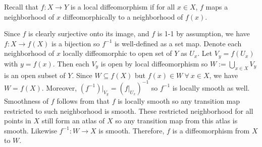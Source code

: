 \documentclass[12pt]{article}
\begin{document}
\begin{problem}[1.3.5]
Recall that $ f:X \to Y$ is a local diffeomorphism if for all $ x \in X$, $ f$  maps a neighborhood of $ x$ diffeomorphically to a neighborhood of  $ f(x)$. 

Since $ f$ is clearly surjective onto its image, and $ f$ is 1-1 by assumption, we have  $ f:X \to f(X)$ is a bijection so $ f^{-1}$ is well-defined as a set map. Denote each neighborhood of $ x$ locally diffeomorphic to open set of $ Y$ as  $ U_x$. Let $ V_y = f(U_x)$ with  $ y = f(x)$. Then each $ V_y$ is open by local diffeomorphism so $ W:=\bigcup_{ x \in X} V_y $ is an open subset of $ Y$. Since $ W \subseteq f(X)$ but $ f(x) \in W \ \forall \ x \in X$, we have $ W = f(X)$. Moreover, $ (f^{-1})|_{V_y} = (f|_{U_x})^{-1}$ so $ f^{-1}$ is locally smooth as well. Smoothness of $ f$ follows from that $ f$ is locally smooth so any transition map restricted to such neighborhood is smooth. These restricted neighborhood for all points in $ X$ still form an atlas of $ X$ so  any transition map from this atlas is smooth. Likewise $ f^{-1}: W \to X$ is smooth. Therefore, $ f$ is a diffeomorphism from  $ X$ to  $ W$.
\end{problem}
\end{document}
